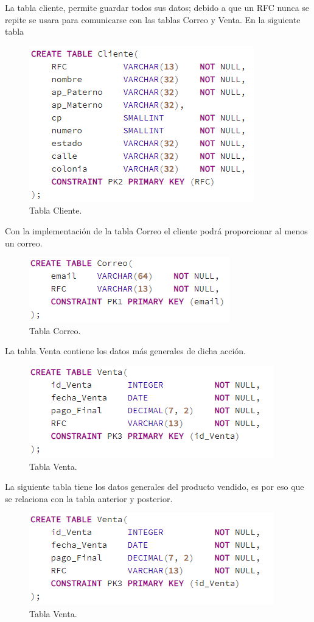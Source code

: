 \documentclass[12pt,letterpaper]{article}
\begin{document}
	
	La tabla cliente, permite guardar todos sus datos;  debido a que un RFC nunca se repite se  usara para comunicarse con las tablas Correo y Venta. 
	En la siguiente tabla 
	\begin{figure}[H]
		\centering
		\includegraphics[scale=0.90]{Documentacion/img/tablaCliente.PNG}
		\caption{Tabla Cliente.}
	\end{figure}
	Con la implementación de la tabla Correo el cliente podrá proporcionar al menos un correo. 
	\begin{figure}[H]
		\centering
		\includegraphics[scale=0.90]{Documentacion/img/tablaCorreo.PNG}
		\caption{Tabla Correo.}
	\end{figure}
	La tabla Venta contiene los datos más generales de dicha acción. 	
	\begin{figure}[H]
		\centering
		\includegraphics[scale=0.90]{Documentacion/img/tablaVenta.PNG}
		\caption{Tabla Venta.}
	\end{figure}
	La siguiente tabla tiene los datos generales del producto vendido, es por eso que se relaciona con la tabla anterior y posterior. 
	\begin{figure}[H]
		\centering
		\includegraphics[scale=0.90]{Documentacion/img/tablaVenta.PNG}
		\caption{Tabla Venta.}
	\end{figure}
\end{document}

